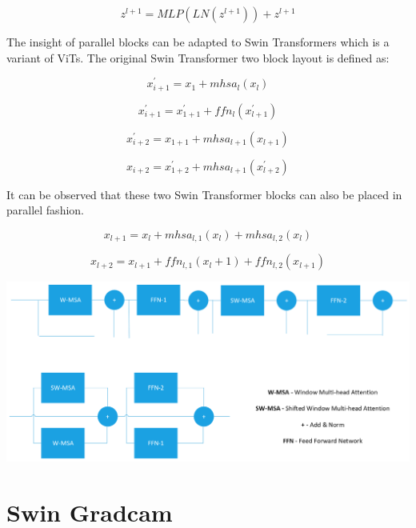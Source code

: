\documentclass[10pt,twocolumn,letterpaper]{article}
\begin{document}
\begin{equation}
z^{l+1} = MLP (LN(z^{l+1})) + z^{l+1}
\end{equation}

The insight of parallel blocks can be adapted to Swin Transformers\cite{liu2021swin} which is a variant of ViTs. The original Swin Transformer two block layout is defined as:

\begin{equation}
x^{'}_{i+1} = x_1 + mhsa_l(x_l)
\end{equation}

\begin{equation}
x^{'}_{i+1} = x^{'}_{1+1} + ffn_l(x^{'}_{l+1})
\end{equation}

\begin{equation}
x^{'}_{i+2} = x_{1+1} + mhsa_{l+1}(x_{l+1})
\end{equation}

\begin{equation}
x_{i+2} = x^{'}_{1+2} + mhsa_{l+1}(x^{'}_{l+2})
\end{equation}

It can be observed that these two Swin Transformer blocks can also be placed in parallel fashion.

\begin{equation}
x_{l+1} = x_{l} + mhsa_{l,1}(x_l) + mhsa_{l,2}(x_l)
\end{equation}

\begin{equation}
x_{l+2} = x_{l+1} + ffn_{l,1}(x_l+1) + ffn_{l,2}(x_{l+1})
\end{equation}

\includegraphics[width=0.8\linewidth]{docs/latex/images/brandon/MSA-Swin.png}
\clearpage

\section{Swin Gradcam} \label{SwinGradCamRefs}
\end{document}
